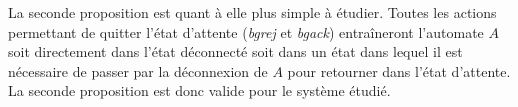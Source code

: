 La seconde proposition est quant à elle plus simple à étudier. Toutes les actions permettant de quitter l'état d'attente (\emph{bgrej} et \emph{bgack}) entraîneront l'automate $A$ soit directement dans l'état déconnecté soit dans un état dans lequel il est nécessaire de passer par la déconnexion de $A$ pour retourner dans l'état d'attente.  La seconde proposition est donc valide pour le système étudié.




